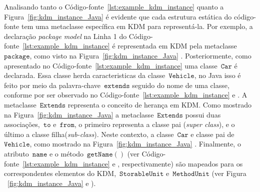 Analisando tanto o Código-fonte~\ref{lst:example_kdm_instance} quanto a Figura~\ref{fig:kdm_instance_Java} é evidente que cada estrutura estática do código-fonte tem uma metaclasse específica em KDM para representá-la. Por exemplo, a declaração \textit{package} \textit{model} na Linha 1 do Código-fonte~\ref{lst:example_kdm_instance}  é representada em KDM pela metaclasse ~$\mathtt{package}$, como visto na Figura~\ref{fig:kdm_instance_Java} . Posteriormente, como apresentado no Código-fonte~\ref{lst:example_kdm_instance}  uma classe~$\mathtt{Car}$ é declarada. Essa classe herda caracteristicas da classe~$\mathtt{Vehicle}$, no Java isso é feito por meio da palavra-chave~$\mathtt{extends}$ seguido do nome de uma classe, conforme por ser observado no Código-fonte~\ref{lst:example_kdm_instance}  e . A metaclasse~$\mathtt{Extends}$ representa o conceito de herança em KDM. Como mostrado na Figura~\ref{fig:kdm_instance_Java}  a metaclasse~$\mathtt{Extends}$ possui duas associações,~$\mathtt{to}$ e~$\mathtt{from}$, o primeiro representa a classe pai (\textit{super class}), e o último a classe filha(\textit{sub-class}). Neste contexto, a classe~$\mathtt{Car}$ e classe pai de~$\mathtt{Vehicle}$, como mostrado na Figura~\ref{fig:kdm_instance_Java} . Finalmente, o atributo~$\mathtt{name}$ e o método~$\mathtt{getName()}$ (ver Código-fonte~\ref{lst:example_kdm_instance}  e , respectivamente) são mapeados para os correspondentes elementos do KDM,~$\mathtt{StorableUnit}$ e~$\mathtt{MethodUnit}$ (ver Figura ~\ref{fig:kdm_instance_Java}  e ). 



